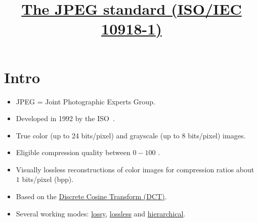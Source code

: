 
\title{\href{https://jpeg.org/jpeg/index.html}{The JPEG standard (ISO/IEC 10918-1)}}
\maketitle
\tableofcontents

\section{Intro}
\begin{itemize}
\item JPEG = Joint Photographic Experts Group.
\item Developed in 1992 by the ISO~\cite{CCITT.T81}.
\item True color (up to 24 bits/pixel) and grayscale (up to 8
  bits/pixel) images.
\item Eligible compression quality between $0-100$ \cite{Wallace91}.
\item Visually lossless reconstructions of color images for
  compression ratios about $1$ bits/pixel (bpp).
\item Based on the
  \href{https://en.wikipedia.org/wiki/Discrete_cosine_transform}{Discrete
    Cosine Transform (DCT)}.
\item Several working modes:
  \href{https://en.wikipedia.org/wiki/Lossy_compression}{lossy},
  \href{https://en.wikipedia.org/wiki/Lossless_compression}{lossless}
  and
  \href{https://www.ece.ucdavis.edu/cerl/reliablejpeg/compression/}{hierarchical}.
\end{itemize}

